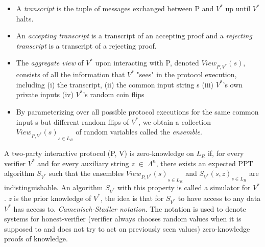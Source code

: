 \documentclass[a4paper]{article}
\begin{document}
\begin{itemize}
  \item A \emph{transcript} is the tuple of messages exchanged between P and ${V^{*}}$ up until ${V^{*}}$ halts. 
  \item An \emph{accepting transcript} is a transcript of an accepting proof and a \emph{rejecting transcript} is a transcript of a rejecting proof.
  \item The \emph{aggregate view} of ${V^{*}}$ upon interacting with P, denoted $View_{P,V^{*}}(s)$, consists of all the information that ${V^{*}}$ "sees" in the protocol execution, including (i) the transcript, (ii) the common input string s (iii) ${V^{*}}$’s own private inputs (iv) ${V^{*}}$’s random coin flips  
  \item By parameterizing over all possible protocol executions for the same common input s but different random flips of ${V^{*}}$, we obtain a collection ${ View_{P,V^{*}}(s)}_{s \in L_R }$ of random variables called the \emph{ensemble}.
\end{itemize}
A two-party interactive protocol (P, V) is zero-knowledge on \textit{$L_R$} if, for every verifier ${V^{*}}$ and for every auxiliary string \textit{z} $\in$ \(\Lambda^n\), there exists an expected PPT algorithm $S_{V^{*}}$ such that the ensembles ${ View_{P,V^{*}}(s)}_{s \in L_R }$ and ${S_{V^{*}}(s,z)}_{s \in L_R }$ are indistinguishable. An algorithm $S_{V^{*}}$ with this property is called a simulator for ${V^{*}}$. \textit{z} is the prior knowledge of ${V^{*}}$, the idea is that for $S_{V^{*}}$ to have access to any data ${V^{*}}$ has access to. 
\newline
\textit{ Camenisch-Stadler notation}. The notation is used to denote systems for honest-verifier (verifier always chooses random values when it is supposed to and does not try to act on previously seen values) zero-knowledge proofs of knowledge.
\end{document}
